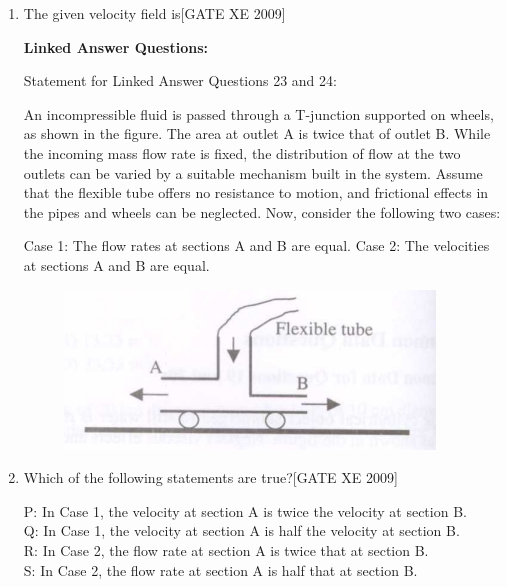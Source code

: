 \documentclass[journal,12pt,onecolumn]{IEEEtran}
\theoremstyle{remark}
\begin{document}
\begin{enumerate}
\item The given velocity field is\hfill[GATE XE 2009]

\begin{enumerate}[leftmargin=*, itemsep=4pt]
\end{enumerate}




\textbf{Linked Answer Questions:}

Statement for Linked Answer Questions 23 and 24:

An incompressible fluid is passed through a T-junction supported on wheels, as shown in the figure. The area at outlet A is twice that of outlet B. While the incoming mass flow rate is fixed, the distribution of flow at the two outlets can be varied by a suitable mechanism built in the system. Assume that the flexible tube offers no resistance to motion, and frictional effects in the pipes and wheels can be neglected. Now, consider the following two cases:

Case 1: The flow rates at sections A and B are equal.
Case 2: The velocities at sections A and B are equal.


\begin{figure}[H]
    \centering
    \includegraphics[width=0.5\linewidth]{figs/fig5.png}
    \caption*{}
    \label{fig:Q 36,37}
\end{figure}

\item Which of the following statements are true?\hfill[GATE XE 2009]

P: In Case 1, the velocity at section A is twice the velocity at section B.\\
Q: In Case 1, the velocity at section A is half the velocity at section B.\\
R: In Case 2, the flow rate at section A is twice that at section B.\\
S: In Case 2, the flow rate at section A is half that at section B.
\begin{enumerate}
    


\end{enumerate}
\end{enumerate}
\end{document}
